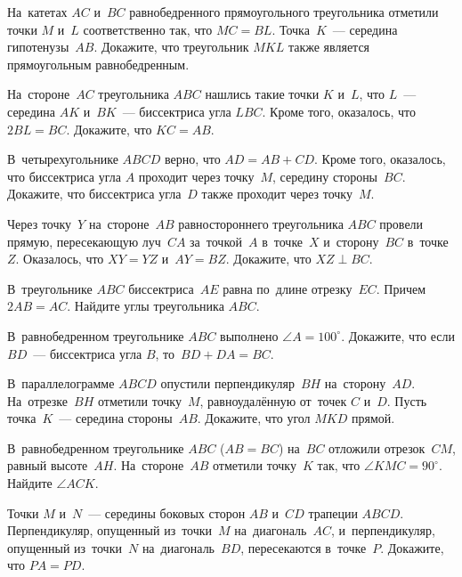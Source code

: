 


\begin{problems}

\item
На~катетах $AC$ и~$BC$ равнобедренного прямоугольного треугольника отметили
точки $M$ и~$L$ соответственно так, что $MC = BL$.
Точка~$K$~--- середина гипотенузы~$AB$.
Докажите, что треугольник $MKL$ также является прямоугольным равнобедренным.

\item
На~стороне~$AC$ треугольника $ABC$ нашлись такие точки $K$ и~$L$, что
$L$~--- середина $AK$ и~$BK$~--- биссектриса угла $LBC$.
Кроме того, оказалось, что $2 BL = BC$.
Докажите, что $KC = AB$.

\item
В~четырехугольнике $ABCD$ верно, что $AD = AB + CD$.
Кроме того, оказалось, что биссектриса угла $A$ проходит через точку~$M$,
середину стороны~$BC$.
Докажите, что биссектриса угла~$D$ также проходит через точку~$M$.

\item
Через точку~$Y$ на~стороне~$AB$ равностороннего треугольника $ABC$ провели
прямую, пересекающую луч~$CA$ за~точкой~$A$ в~точке~$X$ и~сторону~$BC$
в~точке~$Z$.
Оказалось, что $XY = YZ$
и~$AY = BZ$.
Докажите, что $XZ \perp BC$.

\item
В~треугольнике $ABC$ биссектриса~$AE$ равна по~длине отрезку~$EC$.
Причем $2 AB = AC$.
Найдите углы треугольника $ABC$.

\item
В~равнобедренном треугольнике $ABC$ выполнено $\angle A = 100^{\circ}$.
Докажите, что если $BD$~--- биссектриса угла $B$, то~$BD + DA = BC$.

\item
В~параллелограмме $ABCD$ опустили перпендикуляр~$BH$ на~сторону~$AD$.
На~отрезке~$BH$ отметили точку~$M$, равноудалённую от~точек $C$ и~$D$.
Пусть точка~$K$~--- середина стороны~$AB$.
Докажите, что угол $MKD$ прямой.

\item
В~равнобедренном треугольнике $ABC$ ($AB = BC$) на~$BC$ отложили отрезок~$CM$,
равный высоте~$AH$.
На~стороне~$AB$ отметили точку~$K$ так, что $\angle KMC = 90^{\circ}$.
Найдите $\angle ACK$.

\item
Точки $M$ и~$N$~--- середины боковых сторон $AB$ и~$CD$ трапеции $ABCD$.
Перпендикуляр, опущенный из~точки~$M$ на~диагональ~$AC$, и~перпендикуляр,
опущенный из~точки~$N$ на~диагональ~$BD$, пересекаются в~точке~$P$.
Докажите, что $PA = PD$.

\end{problems}

